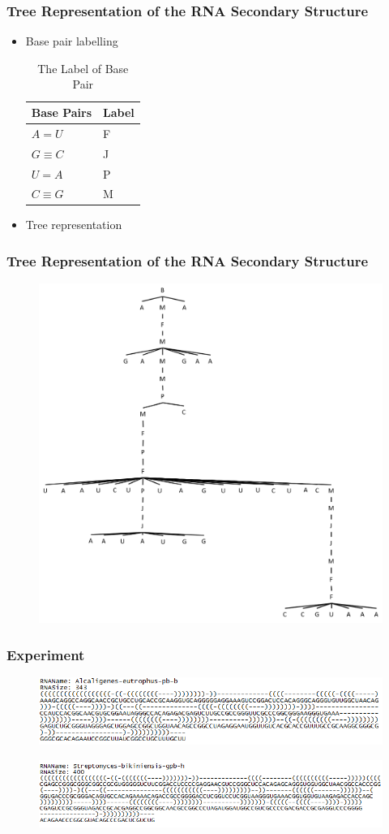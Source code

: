 \documentclass{beamer}
\begin{document}
\begin{frame}
\frametitle{Tree Representation of the RNA Secondary Structure}
\begin{itemize}
\item Base pair labelling
\begin{table}
			\centering
			\begin{tabular}{l l}
				\toprule
				\textbf{Base Pairs} & \textbf{Label}\\
				\midrule
				$A = U$ & F\\
				$G \equiv C$ & J\\
				$U = A$ & P\\
				$C \equiv G$ & M\\
			\end{tabular}
		\caption{The Label of Base Pair}
\end{table}
\item Tree representation
\end{itemize}
\end{frame}
\begin{frame}
\frametitle{Tree Representation of the RNA Secondary Structure}
\begin{figure}
	\includegraphics[width=0.6\linewidth]{RNAST3}
	\centering
\end{figure}
\end{frame}
\begin{frame}
\frametitle{Experiment}
\begin{figure}
	\includegraphics[width=1.0\linewidth]{AlcaligenesString}
	\centering
\end{figure}
\begin{figure}
	\includegraphics[width=1.0\linewidth]{StreptomycesString}
	\centering
\end{figure}
\end{frame}
\end{document}
